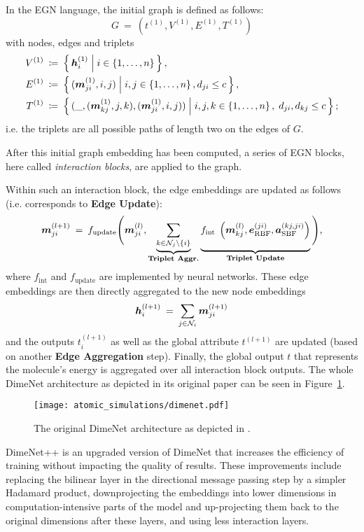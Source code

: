 In the EGN language, the initial graph is defined as follows:
\[
    G \: = \: (t^{(1)}, V^{(1)}, E^{(1)}, T^{(1)})
\]
with nodes, edges and triplets
\begin{align*}
    V^{(1)} \: &\coloneqq \: \left\{\, \boldsymbol{h}_i^{(1)} \; \middle| \; i \in \left\{1, \dots, n\right\} \,\right\}, \\
    E^{(1)} \: &\coloneqq \: \left\{\, (\boldsymbol{m}_{ji}^{(1)}, i, j) \; \middle| \; i, j \in \left\{1, \dots, n\right\}, d_{ji} \leq c \,\right\}, \\
    T^{(1)} \: &\coloneqq \: \left\{\, (\_,(\boldsymbol{m}_{kj}^{(1)}, j, k), (\boldsymbol{m}_{ji}^{(1)}, i, j)) \; \middle| \; i, j, k \in \left\{1, \dots, n\right\}, \; d_{ji}, d_{kj} \leq c \,\right\} \text{;}
\end{align*}
i.e. the triplets are all possible paths of length two on the edges of $G$.

After this initial graph embedding has been computed, a series of EGN blocks,
here called \textit{interaction blocks}, are applied to the graph.

Within such an interaction block, the edge embeddings 
are updated as follows (i.e. corresponds to \textbf{Edge Update}):
\[
    \mm_{ji}^{(l+1)} \: = \: 
    f_{\text{update}}\Bigg(\mm_{ji}^{(l)}, 
    \underbrace{\sum_{k \in \mathcal{N}_{j} \backslash\{i\}}}_{\textbf{Triplet Aggr.}} 
    \underbrace{ \vphantom{\sum_{\mathcal{N}_j}} 
    f_{\text {int }}\left(\mm_{k j}^{(l)}, \ee_{\text{RBF}}^{(ji)}, 
    \aaa_{\text{SBF}}^{(kj, ji)}\right)}
    _{\textbf{Triplet Update}}\Bigg) \text{,}
\]
where $f_{\text{int}}$ and $f_{\text{update}}$ are implemented by neural networks.
These edge embeddings are then directly aggregated to the new node embeddings
\[
    \boldsymbol{h}_i^{(l+1)} \: = \: \sum_{j \in \mathcal{N}_i} \boldsymbol{m}_{ji}^{(l+1)}
\]
and the outputs $t^{(l+1)}_i$ as well as the global attribute $t^{(l+1)}$ are
updated (based on another \textbf{Edge Aggregation} step).
Finally, the global output $t$ that represents the molecule's energy is 
aggregated over all interaction block outputs.
The whole DimeNet architecture as depicted in its original paper 
\cite{DBLP:journals/corr/abs-2003-03123} can be seen in Figure~\ref{fig:dimenet}.

\begin{figure}[H]
    \centering
    \texttt{[image: atomic\_simulations/dimenet.pdf]}
    \caption{The original DimeNet architecture as depicted in \cite*{DBLP:journals/corr/abs-2003-03123}.}
    \label{fig:dimenet}
\end{figure}

DimeNet++ \cite{https://doi.org/10.48550/arxiv.2011.14115} is an upgraded version of 
DimeNet that increases the efficiency of training without impacting the quality of results. 
These improvements include replacing the bilinear layer in the directional message passing 
step by a simpler Hadamard product, downprojecting the embeddings into lower dimensions in
computation-intensive parts of the model and up-projecting them back to the original dimensions 
after these layers, and using less interaction layers.
